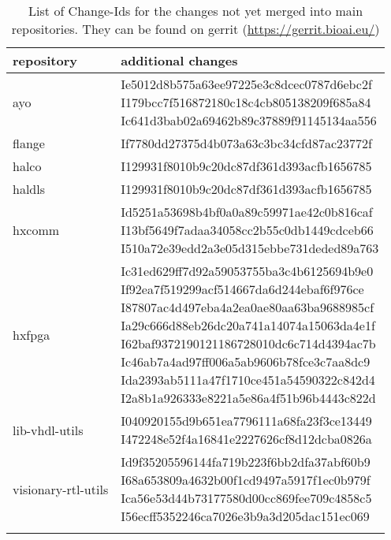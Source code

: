 \documentclass[10.5pt,a4paper,DIV=15]{scrartcl}
\begin{document}
\begin{table}[H]
\centering\begin{tabular}{l >{\ttfamily}l}
\toprule{} repository & additional changes \\
\midrule{} ayo & \makecell{Ie5012d8b575a63ee97225e3c8dcec0787d6ebc2f\\ I179bcc7f516872180c18c4cb805138209f685a84\\ Ic641d3bab02a69462b89c37889f91145134aa556} \\
flange & If7780dd27375d4b073a63c3bc34cfd87ac23772f \\
halco & I129931f8010b9c20dc87df361d393acfb1656785 \\
haldls & I129931f8010b9c20dc87df361d393acfb1656785 \\
hxcomm & \makecell{Id5251a53698b4bf0a0a89c59971ae42c0b816caf\\ I13bf5649f7adaa34058cc2b55c0db1449cdceb66\\ I510a72e39edd2a3e05d315ebbe731deded89a763} \\
hxfpga & \makecell{Ic31ed629ff7d92a59053755ba3c4b6125694b9e0\\ If92ea7f519299acf514667da6d244ebaf6f976ce\\ I87807ac4d497eba4a2ea0ae80aa63ba9688985cf\\ Ia29c666d88eb26dc20a741a14074a15063da4e1f\\ I62baf9372190121186728010dc6c714d4394ac7b\\ Ic46ab7a4ad97ff006a5ab9606b78fce3c7aa8dc9\\ Ida2393ab5111a47f1710ce451a54590322c842d4\\ I2a8b1a926333e8221a5e86a4f51b96b4443c822d} \\
lib-vhdl-utils & \makecell{I040920155d9b651ea7796111a68fa23f3ce13449\\  I472248e52f4a16841e2227626cf8d12dcba0826a} \\
visionary-rtl-utils & \makecell{Id9f35205596144fa719b223f6bb2dfa37abf60b9\\ I68a653809a4632b00f1cd9497a5917f1ec0b979f\\ Ica56e53d44b73177580d00cc869fee709c4858c5\\  I56ecff5352246ca7026e3b9a3d205dac151ec069} \\
\bottomrule{}
\end{tabular}
\caption{List of Change-Ids for the changes not yet merged into main repositories. They can be found on gerrit (\url{https://gerrit.bioai.eu/})}\label{tbl:change_ids}
\end{table}
\end{document}
